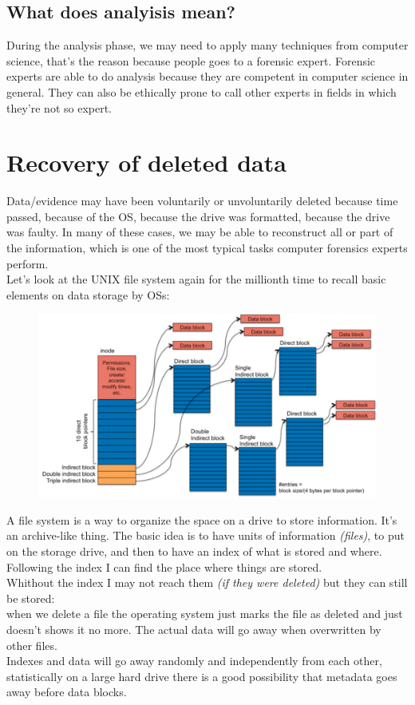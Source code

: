     \subsection{What does analyisis mean?}
        During the analysis phase, we may need to apply many techniques from computer science, that's the reason because people goes to a forensic expert. 
        Forensic experts are able to do analysis because they are competent in computer science in general. They can also be ethically prone to call other experts in fields in which they're not so expert.
    \section{Recovery of deleted data} 
        Data/evidence may have been voluntarily or unvoluntarily deleted because time passed, because of the OS, because the drive was formatted, because the drive was faulty.
        In many of these cases, we may be able to reconstruct all or part of the information, which is one of the most typical tasks computer forensics experts perform.\\
        Let's look at the UNIX file system again for the millionth time to recall basic elements on data storage by OSs:\\
        \begin{figure}
            \centering
            \includegraphics[width=0.7\linewidth]{filesystem.png}
        \end{figure}
        A file system is a way to organize the space on a drive to store information. It's an archive-like thing.
        The basic idea is to have units of information \textit{(files)}, to put on the storage drive, and then to have an index of what is stored and where. Following the index I can find the place where things are stored.\\
        Whithout the index I may not reach them \textit{(if they were deleted)} but they can still be stored:\\
        when we delete a file the operating system just marks the file as deleted and just doesn't shows it no more. The actual data will go away when overwritten by other files.\\
        Indexes and data will go away randomly and independently from each other, statistically on a large hard drive there is a good possibility that metadata goes away before data blocks.
